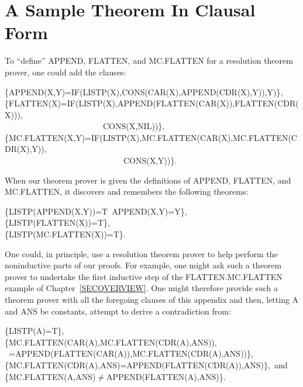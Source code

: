 \documentclass[11pt]{book}
\newenvironment{pubasis}{\begin{flushleft}\ttfamily\small}{\normalsize\rmfamily\end{flushleft}}
\newcommand{\pubdefaulttextsize}{\large}
\begin{document}
\section{A Sample Theorem In Clausal Form}
\pubdefaulttextsize
To ``define'' APPEND, FLAT\-TEN, and MC.FLAT\-TEN for a resolution theorem
prover, one could add
the clauses:
\begin{pubasis}
\{APPEND(X,Y)=IF(LISTP(X),CONS(CAR(X),APPEND(CDR(X),Y)),Y)\},\\

\{FLATTEN(X)=IF(LISTP(X),APPEND(FLATTEN(CAR(X)),FLATTEN(CDR(X))),\\
~~~~~~~~~~~~~~~~~~~~~~~~CONS(X,NIL))\},\\

\{MC.FLAT\-TEN(X,Y)=IF(LISTP(X),MC.FLAT\-TEN(CAR(X),MC.FLAT\-TEN(CDR(X),Y)),\\
~~~~~~~~~~~~~~~~~~~~~~~~~~~~~CONS(X,Y))\}.\\
\end{pubasis}
When our theorem prover is given the definitions of APPEND, FLATTEN,
and MC.FLAT\-TEN, it discovers and remembers the following theorems:
\begin{pubasis}
\{LISTP(APPEND(X,Y))=T~APPEND(X,Y)=Y\},\\

\{LISTP(FLATTEN(X))=T\},\\

\{LISTP(MC.FLAT\-TEN(X))=T\}.\\
\end{pubasis}
One could, in principle, use a resolution theorem prover to help perform
the noninductive parts of our proofs.  For example, one might
ask such a theorem prover to undertake the first
inductive step of the FLAT\-TEN.MC.FLAT\-TEN
example of Chapter~\ref{SECOVERVIEW}.  One might therefore provide such a theorem
prover with all the foregoing clauses of this appendix and then, letting A and ANS
be constants, attempt to derive a contradiction from:
\begin{pubasis}
\{LISTP(A)=T\},\\

\{MC.FLAT\-TEN(CAR(A),MC.FLAT\-TEN(CDR(A),ANS)),\\
~=APPEND(FLAT\-TEN(CAR(A)),MC.FLAT\-TEN(CDR(A),ANS))\},\\

\{MC.FLAT\-TEN(CDR(A),ANS)=APPEND(FLAT\-TEN(CDR(A)),ANS)\},~and\\

\{MC.FLAT\-TEN(A,ANS)$\neq$APPEND(FLAT\-TEN(A),ANS)\}.\\
\end{pubasis}
\end{document}
